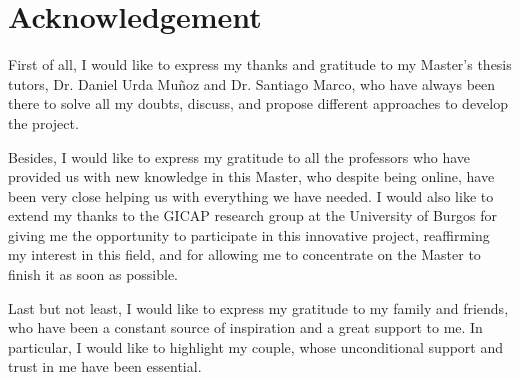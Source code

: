 %
\section*{Acknowledgement}
\label{sec::acknowledgement}


First of all, I would like to express my thanks and gratitude to my Master's thesis tutors, Dr. Daniel Urda Muñoz and Dr. Santiago Marco, who have always been there to solve all my doubts, discuss, and propose different approaches to develop the project. 

Besides, I would like to express my gratitude to all the professors who have provided us with new knowledge in this Master, who despite being online, have been very close helping us with everything we have needed. 
I would also like to extend my thanks to the GICAP research group at the University of Burgos for giving me the opportunity to participate in this innovative project, reaffirming my interest in this field, and for allowing me to concentrate on the Master to finish it as soon as possible.

Last but not least, I would like to express my gratitude to my family and friends, who have been a constant source of inspiration and a great support to me. In particular, I would like to highlight my couple, whose unconditional support and trust in me have been essential.







